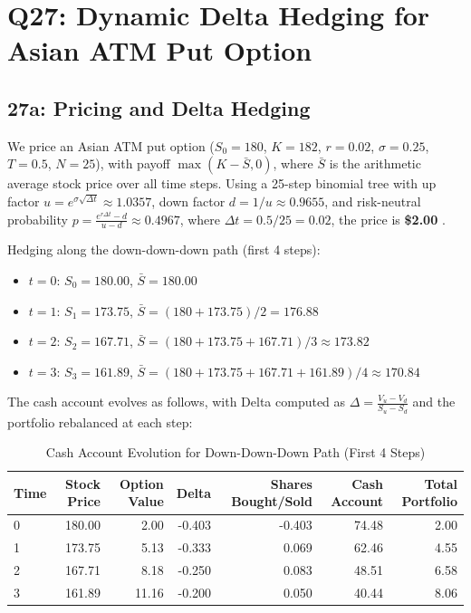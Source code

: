 \documentclass{article}
\begin{document}
\section*{Q27: Dynamic Delta Hedging for Asian ATM Put Option}

\subsection*{27a: Pricing and Delta Hedging}

We price an Asian ATM put option ($S_0 = 180$, $K = 182$, $r = 0.02$, $\sigma = 0.25$, $T = 0.5$, $N = 25$), with payoff $\max(K - \bar{S}, 0)$, where $\bar{S}$ is the arithmetic average stock price over all time steps. Using a 25-step binomial tree with up factor $u = e^{\sigma \sqrt{\Delta t}} \approx 1.0357$, down factor $d = 1/u \approx 0.9655$, and risk-neutral probability $p = \frac{e^{r \Delta t} - d}{u - d} \approx 0.4967$, where $\Delta t = 0.5 / 25 = 0.02$, the price is \textbf{\$2.00} \citep{hull2018options}.

Hedging along the down-down-down path (first 4 steps):

\begin{itemize}
    \item $t=0$: $S_0 = 180.00$, $\bar{S} = 180.00$
    \item $t=1$: $S_1 = 173.75$, $\bar{S} = (180 + 173.75)/2 = 176.88$
    \item $t=2$: $S_2 = 167.71$, $\bar{S} = (180 + 173.75 + 167.71)/3 \approx 173.82$
    \item $t=3$: $S_3 = 161.89$, $\bar{S} = (180 + 173.75 + 167.71 + 161.89)/4 \approx 170.84$
\end{itemize}

The cash account evolves as follows, with Delta computed as $\Delta = \frac{V_u - V_d}{S_u - S_d}$ and the portfolio rebalanced at each step:

\begin{table}[h]
\centering
\caption{Cash Account Evolution for Down-Down-Down Path (First 4 Steps)}
\begin{tabular}{lrrrrrr}
\toprule
Time & Stock Price & Option Value & Delta & Shares Bought/Sold & Cash Account & Total Portfolio \\
\midrule
0 & 180.00 & 2.00 & -0.403 & -0.403 & 74.48 & 2.00 \\
1 & 173.75 & 5.13 & -0.333 & 0.069 & 62.46 & 4.55 \\
2 & 167.71 & 8.18 & -0.250 & 0.083 & 48.51 & 6.58 \\
3 & 161.89 & 11.16 & -0.200 & 0.050 & 40.44 & 8.06 \\
\bottomrule
\end{tabular}
\end{table}
\end{document}
